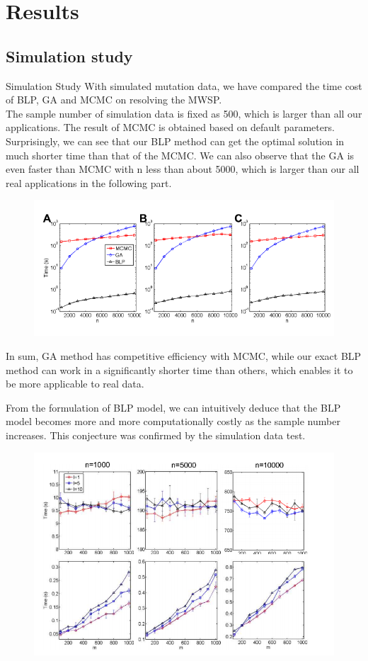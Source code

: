 \documentclass[xcolor=dvipsnames]{beamer}
\begin{document}
\section{Results}
\subsection{Simulation study}
\begin{frame}{Simulation Study}
With simulated mutation data, we have compared the time cost of BLP, GA and MCMC on resolving the MWSP.\\
The sample number of simulation data is fixed as 500, which is larger than all our applications. The result of MCMC is obtained based on default parameters. Surprisingly, we can see that our BLP method can get the optimal solution in much shorter time than that of the MCMC. We can also observe that the GA is even faster than MCMC with n less than about 5000, which is larger than our all real applications in the following part.\\
\end{frame}
\begin{frame}
\begin{figure}
\centering
\includegraphics[width=0.8\linewidth]{comparison.png}
\end{figure}
In sum, GA method has competitive efficiency with MCMC, while our exact BLP method can work in a significantly shorter time than others, which enables it to be more applicable to real data.\\
\end{frame}
\begin{frame}
From the formulation of BLP model, we can intuitively deduce that the BLP model becomes more and more computationally costly as the sample number increases. This conjecture was confirmed by the simulation data test.\\
\begin{figure}
\centering
\includegraphics[width=0.8\linewidth]{GABLP.png}
\end{figure}
\end{frame}
\end{document}
